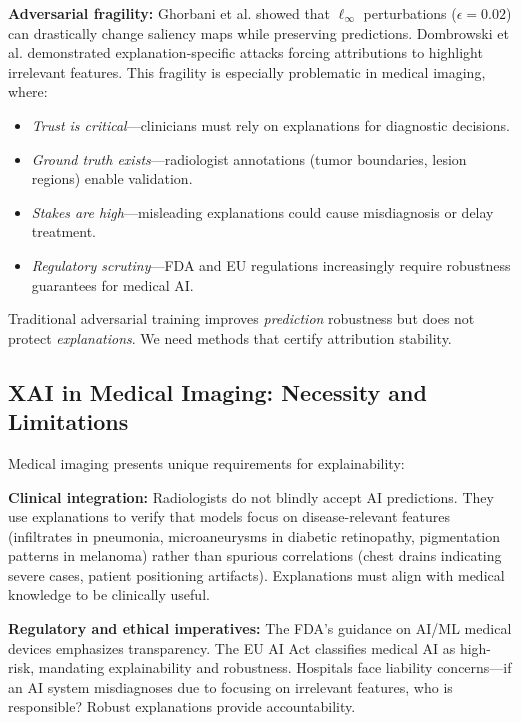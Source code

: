 \documentclass[11pt]{article}
\begin{document}
\textbf{Adversarial fragility:} Ghorbani et al. \cite{ghorbani2019interpretation} showed that $\ell_\infty$ perturbations ($\epsilon=0.02$) can drastically change saliency maps while preserving predictions. Dombrowski et al. \cite{dombrowski2019explanations} demonstrated explanation-specific attacks forcing attributions to highlight irrelevant features. This fragility is especially problematic in medical imaging, where:
\begin{itemize}
    \item \textit{Trust is critical}—clinicians must rely on explanations for diagnostic decisions.
    \item \textit{Ground truth exists}—radiologist annotations (tumor boundaries, lesion regions) enable validation.
    \item \textit{Stakes are high}—misleading explanations could cause misdiagnosis or delay treatment.
    \item \textit{Regulatory scrutiny}—FDA and EU regulations increasingly require robustness guarantees for medical AI.
\end{itemize}

Traditional adversarial training improves \textit{prediction} robustness but does not protect \textit{explanations}. We need methods that certify attribution stability.

\subsection{XAI in Medical Imaging: Necessity and Limitations}

Medical imaging presents unique requirements for explainability:

\textbf{Clinical integration:} Radiologists do not blindly accept AI predictions. They use explanations to verify that models focus on disease-relevant features (infiltrates in pneumonia, microaneurysms in diabetic retinopathy, pigmentation patterns in melanoma) rather than spurious correlations (chest drains indicating severe cases, patient positioning artifacts). Explanations must align with medical knowledge to be clinically useful.

\textbf{Regulatory and ethical imperatives:} The FDA's guidance on AI/ML medical devices emphasizes transparency. The EU AI Act classifies medical AI as high-risk, mandating explainability and robustness. Hospitals face liability concerns—if an AI system misdiagnoses due to focusing on irrelevant features, who is responsible? Robust explanations provide accountability.
\end{document}
